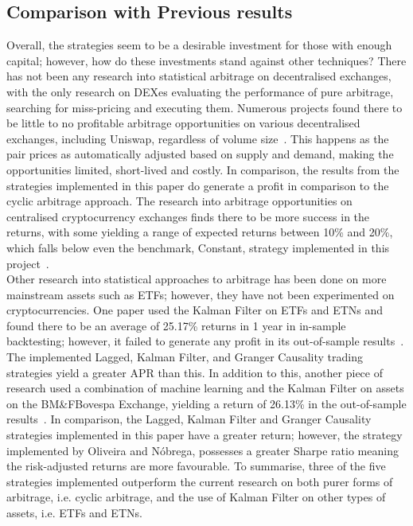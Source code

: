 \subsection{Comparison with Previous results}
Overall, the strategies seem to be a desirable investment for those with enough capital; however, how do these investments stand against other techniques? There has not been any research into statistical arbitrage on decentralised exchanges, with the only research on DEXes evaluating the performance of pure arbitrage, searching for miss-pricing and executing them. Numerous projects found there to be little to no profitable arbitrage opportunities on various decentralised exchanges, including Uniswap, regardless of volume size~\cite{boonpeam2021arbitrage}. This happens as the pair prices as automatically adjusted based on supply and demand, making the opportunities limited, short-lived and costly. In comparison, the results from the strategies implemented in this paper do generate a profit in comparison to the cyclic arbitrage approach. The research into arbitrage opportunities on centralised cryptocurrency exchanges finds there to be more success in the returns, with some yielding a range of expected returns between 10\% and 20\%, which falls below even the benchmark, Constant, strategy implemented in this project~\cite{crepelliere_arbitrage_2022, PAUNACristian2018ATSf}.
\\[3mm]
Other research into statistical approaches to arbitrage has been done on more mainstream assets such as ETFs; however, they have not been experimented on cryptocurrencies. One paper used the Kalman Filter on ETFs and ETNs and found there to be an average of 25.17\% returns in 1 year in in-sample backtesting; however, it failed to generate any profit in its out-of-sample results~\cite{dempsey_market_2017}. The implemented Lagged, Kalman Filter, and Granger Causality trading strategies yield a greater APR than this. In addition to this, another piece of research used a combination of machine learning and the Kalman Filter on assets on the BM\&FBovespa Exchange, yielding a return of 26.13\% in the out-of-sample results~\cite{6974093}. In comparison, the Lagged, Kalman Filter and Granger Causality strategies implemented in this paper have a greater return; however, the strategy implemented by Oliveira and Nóbrega, possesses a greater Sharpe ratio meaning the risk-adjusted returns are more favourable. To summarise, three of the five strategies implemented outperform the current research on both purer forms of arbitrage, i.e. cyclic arbitrage, and the use of Kalman Filter on other types of assets, i.e. ETFs and ETNs.
